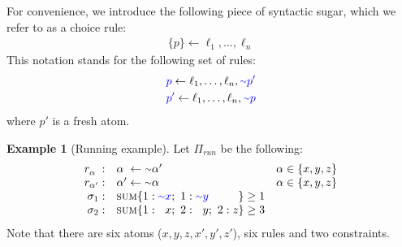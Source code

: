 \documentclass[preprint,authoryear]{elsarticle}
\def\naf{\ensuremath{\raise.17ex\hbox{\ensuremath{\scriptstyle\mathtt{\sim}}}}\xspace}
\theoremstyle{definition}
\newtheorem{example}{Example}[section]
\def\naf{\ensuremath{\raise.17ex\hbox{\ensuremath{\scriptstyle\mathtt{\sim}}}}\xspace}
\begin{document}
For convenience, we introduce the following piece of syntactic sugar, which we refer to as a choice rule:
\begin{align}
\label{eq:choice-rule}
\{p\} \leftarrow \ell_1, \ldots, \ell_n 
\end{align}
This notation stands for the following set of rules:
\begin{align}
\label{eq:choice-rule-rewriting}
& \textcolor{blue}{p} \leftarrow \ell_1, \ldots, \ell_n, \textcolor{blue}{\naf p'} \\
& \textcolor{blue}{p'} \leftarrow \ell_1, \ldots, \ell_n, \textcolor{blue}{\naf p}
\end{align}
where $p'$ is a fresh atom.

\begin{example}[Running example]\label{ex:running}
Let $\Pi_{\mathit{run}}$ be the following:
\begin{align*}
\begin{array}{rll}
    r_{\alpha\phantom{'}}: & \alpha\phantom{'} \leftarrow \naf \alpha' & \alpha \in \{x,y,z\}\\
    r_{\alpha'}: & \alpha' \leftarrow \naf \alpha & \alpha \in \{x,y,z\}\\  %
    \sigma_{1}: & \textsc{sum}\{
        1 : \textcolor{blue}{\naf x};\ 1 : \textcolor{blue}{\naf y}\phantom{;\ 2 : z}
    \} \geq 1 \\
    \sigma_{2}: & \textsc{sum}\{
        1 : \phantom{\naf}x;\ 2 : \phantom{\naf}y;\ 2 : z
    \} \geq 3
\end{array}
\end{align*}
Note that there are six atoms ($x,y,z,x',y',z'$), six rules and two constraints.
\end{example}
\end{document}
